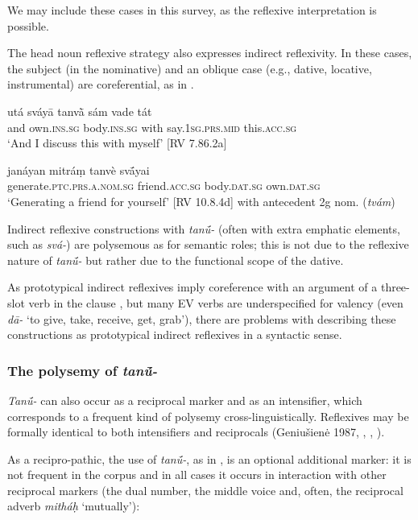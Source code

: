 \documentclass[output=paper]{langscibook}
\begin{document}
We may include these cases in this survey, as the reflexive interpretation is possible.

The head noun reflexive strategy also expresses {indirect} {reflexivity}. In these cases, the subject (in the nominative) and an oblique case (e.g., dative, locative, instrumental) are coreferential, as in .

\ea \label{ex:Orqueda:20}
\ea
 \label{ex:Orqueda:20a}
\gll utá   sváyā  tanv\`{ā}  sám  vade   tát\\
      and  own.\textsc{ins.sg}  body.\textsc{ins.sg}  with  say.\textsc{1sg.prs.mid}   this.\textsc{acc.sg}\\
\glt ‘And I discuss this with myself’ [RV 7.86.2a]

\ex
 \label{ex:Orqueda:20b}
\gll janáyan  mitráṃ  tanvè  sv\'{ā}yai\\
      generate.\textsc{ptc.prs.a.nom.sg}  friend.\textsc{acc.sg}    body.\textsc{dat.sg}  own.\textsc{dat.sg}\\
\glt     ‘Generating a friend for yourself’ [RV 10.8.4d] with antecedent 2g nom. (\textit{tvám})
\z
\z

{Indirect reflexive constructions with \textit{tan\'{ū}-} (often with extra emphatic elements, such as \textit{svá-}) are polysemous as for semantic roles; this is not due to the reflexive nature of \textit{tan\'{ū}-} but rather due to the functional scope of the dative.}

{As prototypical indirect reflexives imply coreference with an argument of a three-slot verb in the clause \citep[77-78]{Kemmer1993}, but many EV verbs are underspecified for valency (even \textit{dā-} ‘to give, take, receive, get, grab’), there are problems with describing these constructions as prototypical indirect reflexives in a syntactic sense.}


\subsubsection{The polysemy of \textit{tan\'{ū}-} }
\label{sec:Orqueda:2.2.3}


\textit{Tan\'{ū}-} can also occur as a {reciprocal} {marker} and as an {intensifier}, which corresponds to a frequent kind of polysemy cross-linguistically. Reflexives may be formally identical to both intensifiers and reciprocals (Geniušien\.e 1987, \citealt{Kemmer1993}, \citealt{KoenigSiemund2000}, \citealt{KoenigGast2006}).

{As a recipro-pathic, the use of \textit{tan\'{ū}-}, as in , is an optional additional marker: it is not frequent in the corpus and in all cases it occurs in interaction with other reciprocal markers (the dual number, the middle voice and, often, the reciprocal adverb \textit{mitháḥ} ‘mutually’):}
\end{document}
